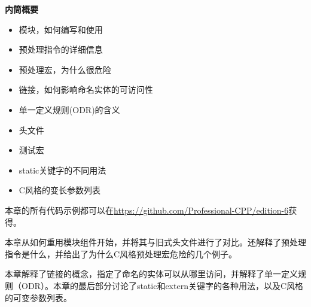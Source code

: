 \noindent
\textbf{内筒概要}

\begin{itemize}
\item
模块，如何编写和使用

\item
预处理指令的详细信息

\item
预处理宏，为什么很危险

\item
链接，如何影响命名实体的可访问性

\item
单一定义规则(ODR)的含义

\item
头文件

\item
测试宏

\item
static关键字的不同用法

\item
C风格的变长参数列表
\end{itemize}

本章的所有代码示例都可以在\url{https://github.com/Professional-CPP/edition-6}获得。

本章从如何重用模块组件开始，并将其与旧式头文件进行了对比。还解释了预处理指令是什么，并给出了为什么C风格预处理宏危险的几个例子。

本章解释了链接的概念，指定了命名的实体可以从哪里访问，并解释了单一定义规则（ODR）。本章的最后部分讨论了static和extern关键字的各种用法，以及C风格的可变参数列表。































